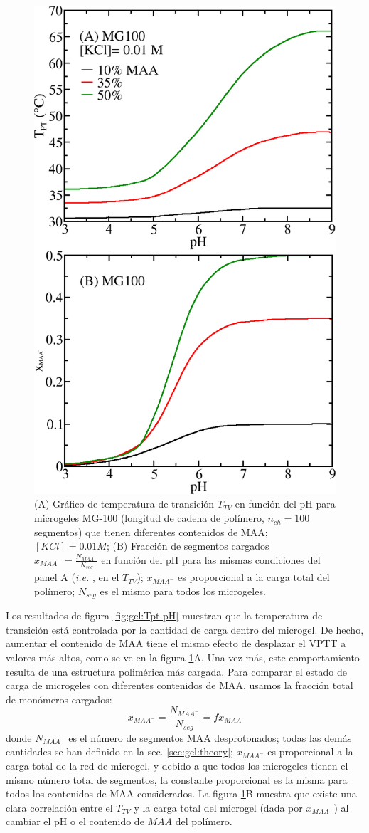 \begin{figure}[!tb]
	\centering
	\includegraphics[width=0.5\linewidth]{Figures/graph-gel/Tpt-pH_MAA.png}
	\caption{(A) Gr\'afico de temperatura de transici\'on $T_{TV}$ en funci\'on del pH para microgeles MG-100 (longitud de cadena de pol\'imero, $n_{ch}=100$ segmentos) que tienen diferentes contenidos de MAA; $[KCl]=0.01 M$;
	(B) Fracci\'on de segmentos cargados $x_{MAA^-}=\frac{N_{MAA^-}}{N_{seg}}$ en funci\'on del pH para las mismas condiciones del panel A (\emph{i.e.} , en el $T_{TV}$); $x_{MAA^-}$ es proporcional a la carga total del pol\'imero; $N_{seg}$ es el mismo para todos los microgeles.}
	\label{fig:gel:Tpt_MAA}
\end{figure}


Los resultados de figura \ref{fig:gel:Tpt-pH} muestran que la temperatura de transici\'on est\'a controlada por la cantidad de carga dentro del microgel.
De hecho, aumentar el contenido de MAA tiene el mismo efecto de desplazar el VPTT a valores m\'as altos, como se ve en la figura \ref{fig:gel:Tpt_MAA}A.
Una vez m\'as, este comportamiento resulta de una estructura polim\'erica m\'as cargada.
Para comparar el estado de carga de microgeles con diferentes contenidos de MAA, usamos la fracci\'on total de mon\'omeros cargados:
%
\begin{equation}
x_{MAA^-}=\frac{N_{MAA^-}}{N_{seg}}=f x_{MAA}
\end{equation}
%
\noindent donde $N_{MAA^-}$ es el n\'umero de segmentos MAA desprotonados; todas las dem\'as cantidades se han definido en la sec. \ref{sec:gel:theory};
$x_{MAA^-}$ es proporcional a la carga total de la red de microgel, y
debido a que todos los microgeles tienen el mismo n\'umero total de segmentos, la constante proporcional es la misma para todos los contenidos de MAA considerados.
La figura \ref{fig:gel:Tpt_MAA}B muestra que existe una clara correlaci\'on entre el $T_{TV}$ y la carga total del microgel (dada por $x_{MAA^-}$) al cambiar el pH o el contenido de $MAA$ del pol\'imero.

